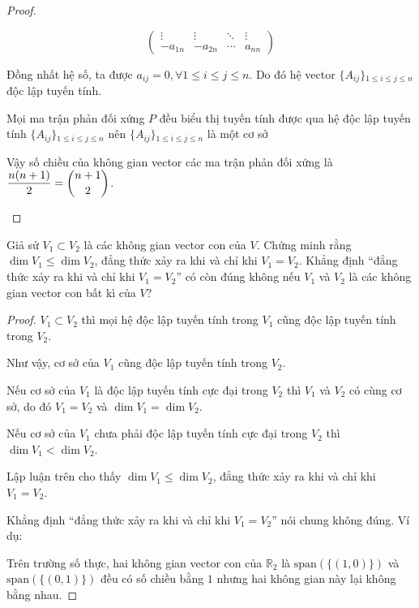 \documentclass[class=linear-algebra,crop=false]{standalone}
\begin{document}
\begin{proof}
\begin{enumerate}
\[\begin{pmatrix}
                      \vdots  & \vdots  & \ddots & \vdots \\
                      -a_{1n} & -a_{2n} & \cdots & a_{nn}
                  \end{pmatrix}
              \]
              \par Đồng nhất hệ số, ta được $a_{ij} = 0, \forall 1\le i\le j\le n$. Do đó hệ vector $\{ A_{ij} \}{}_{1\le i \le j \le n}$ độc lập tuyến tính.
              \par Mọi ma trận phản đối xứng $P$ đều biểu thị tuyến tính được qua hệ độc lập tuyến tính $\{ A_{ij} \}{}_{1\le i \le j \le n}$ nên $\{ A_{ij} \}{}_{1\le i \le j\le n}$ là một cơ sở
              \par Vậy số chiều của không gian vector các ma trận phản đối xứng là $\dfrac{n(n + 1)}{2} = \dbinom{n+1}{2}$.
    \end{enumerate}
\end{proof}

\begin{exercise}Giả sử $V_{1}\subset V_{2}$ là các không gian vector con của $V$. Chứng minh rằng $\dim V_{1} \le \dim V_{2}$, đẳng thức xảy ra khi và chỉ khi $V_{1} = V_{2}$. Khẳng định ``đẳng thức xảy ra khi và chỉ khi $V_{1} = V_{2}$'' có còn đúng không nếu $V_{1}$ và $V_{2}$ là các không gian vector con bất kì của $V$?
\end{exercise}

\begin{proof}$V_{1}\subset V_{2}$ thì mọi hệ độc lập tuyến tính trong $V_{1}$ cũng độc lập tuyến tính trong $V_{2}$.
    \par Như vậy, cơ sở của $V_{1}$ cũng độc lập tuyến tính trong $V_{2}$.
    \par Nếu cơ sở của $V_{1}$ là độc lập tuyến tính cực đại trong $V_{2}$ thì $V_{1}$ và $V_{2}$ có cùng cơ sở, do đó $V_{1} = V_{2}$ và $\dim V_{1} = \dim V_{2}$.
    \par Nếu cơ sở của $V_{1}$ chưa phải độc lập tuyến tính cực đại trong $V_{2}$ thì $\dim V_{1} < \dim V_{2}$.
    \par Lập luận trên cho thấy $\dim V_{1} \le \dim V_{2}$, đẳng thức xảy ra khi và chỉ khi $V_{1} = V_{2}$.
    \par Khẳng định ``đẳng thức xảy ra khi và chỉ khi $V_{1} = V_{2}$'' nói chung không đúng. Ví dụ:
    \par Trên trường số thực, hai không gian vector con của $\mathbb{R}_{2}$ là $\text{span}(\{ (1,0) \})$ và $\text{span}(\{ (0,1) \})$ đều có số chiều bằng $1$ nhưng hai không gian này lại không bằng nhau.
\end{proof}
\end{document}
